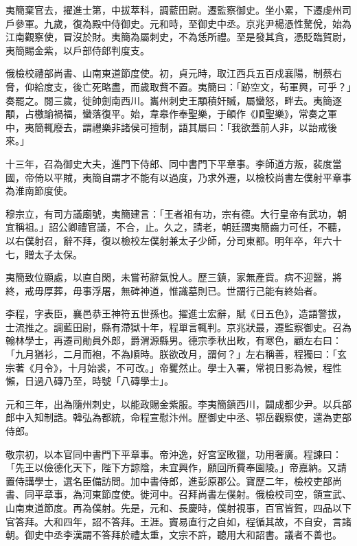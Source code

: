\begin{pinyinscope}
 夷簡棄官去，擢進士第，中拔萃科，調藍田尉。遷監察御史。坐小累，下遷虔州司戶參軍。九歲，復為殿中侍御史。元和時，至御史中丞。京兆尹楊憑性驁侻，始為江南觀察使，冒沒於財。夷簡為屬刺史，不為恁所禮。至是發其貪，憑貶臨賀尉，夷簡賜金紫，以戶部侍郎判度支。



 俄檢校禮部尚書、山南東道節度使。初，貞元時，取江西兵五百戍襄陽，制蔡右脅，仰給度支，後亡死略盡，而歲取貲不置。夷簡曰：「跡空文，茍軍興，可乎？」奏罷之。閱三歲，徙帥劍南西川。巂州刺史王顒積奸贓，屬蠻怒，畔去。夷簡逐顒，占檄諭禍福，蠻落復平。始，韋皋作奉聖樂，于頔作《順聖樂》，常奏之軍中，夷簡輒廢去，謂禮樂非諸侯可擅制，語其屬曰：「我欲蓋前人非，以詒戒後來。」



 十三年，召為御史大夫，進門下侍郎、同中書門下平章事。李師道方叛，裴度當國，帝倚以平賊，夷簡自謂才不能有以過度，乃求外遷，以檢校尚書左僕射平章事為淮南節度使。



 穆宗立，有司方議廟號，夷簡建言：「王者祖有功，宗有德。大行皇帝有武功，朝宜稱祖。」詔公卿禮官議，不合，止。久之，請老，朝廷謂夷簡齒力可任，不聽，以右僕射召，辭不拜，復以檢校左僕射兼太子少師，分司東都。明年卒，年六十七，贈太子太保。



 夷簡致位顯處，以直自閑，未嘗茍辭氣悅人。歷三鎮，家無產貲。病不迎醫，將終，戒毋厚葬，毋事浮屠，無碑神道，惟識墓則已。世謂行己能有終始者。



 李程，字表臣，襄邑恭王神符五世孫也。擢進士宏辭，賦《日五色》，造語警拔，士流推之。調藍田尉，縣有滯獄十年，程單言輒判。京兆狀最，遷監察御史。召為翰林學士，再遷司勛員外郎，爵渭源縣男。德宗季秋出畋，有寒色，顧左右曰：「九月猶衫，二月而袍，不為順時。朕欲改月，謂何？」左右稱善，程獨曰：「玄宗著《月令》，十月始裘，不可改。」帝矍然止。學士入署，常視日影為候，程性懶，日過八磚乃至，時號「八磚學士」。



 元和三年，出為隨州刺史，以能政賜金紫服。李夷簡鎮西川，闢成都少尹。以兵部郎中入知制誥。韓弘為都統，命程宣慰汴州。歷御史中丞、鄂岳觀察使，還為吏部侍郎。



 敬宗初，以本官同中書門下平章事。帝沖逸，好宮室畋獵，功用奢廣。程諫曰：「先王以儉德化天下，陛下方諒陰，未宜興作，願回所費奉園陵。」帝嘉納。又請置侍講學士，選名臣備訪問。加中書侍郎，進彭原郡公。寶歷二年，檢校吏部尚書、同平章事，為河東節度使。徙河中。召拜尚書左僕射。俄檢校司空，領宣武、山南東道節度。再為僕射。先是，元和、長慶時，僕射視事，百官皆賀，四品以下官答拜。大和四年，詔不答拜。王涯。竇易直行之自如，程循其故，不自安，言諸朝。御史中丞李漢謂不答拜於禮太重，文宗不許，聽用大和詔書。議者不善也。




\end{pinyinscope}
